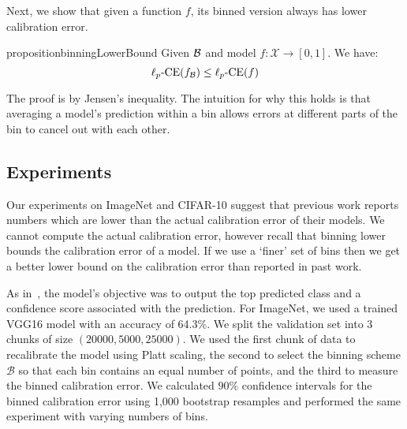 Next, we show that given a function $f$, its binned version always has lower calibration error.



\begin{restatable}{proposition}{binningLowerBound}
\label{prop:bin_low_bound}
Given $\mathcal{B}{}$ and model $f : \mathcal{X} \to [0, 1]$. We have:
\[  \ell_p\mbox{-CE}(f_{\mathcal{B}{}}) \leq \ell_p\mbox{-CE}(f) \]
\end{restatable}

The proof is by Jensen's inequality. The intuition for why this holds is that averaging a model's prediction within a bin allows errors at different parts of the bin to cancel out with each other. 

\subsection{Experiments}

Our experiments on ImageNet and CIFAR-10 suggest that previous work reports numbers which are lower than the actual calibration error of their models. We cannot compute the actual calibration error, however recall that binning lower bounds the calibration error of a model. If we use a `finer' set of bins then we get a better lower bound on the calibration error than reported in past work.

As in~\cite{guo2017calibration}, the model's objective was to output the top predicted class and a confidence score associated with the prediction. For ImageNet, we used a trained VGG16 model with an accuracy of 64.3\%. We split the validation set into 3 chunks of size $(20000, 5000, 25000)$. We used the first chunk of data to recalibrate the model using Platt scaling, the second to select the binning scheme $\mathcal{B}$ so that each bin contains an equal number of points, and the third to measure the binned calibration error. We calculated $90\%$ confidence intervals for the binned calibration error using 1,000 bootstrap resamples and performed the same experiment with varying numbers of bins.

